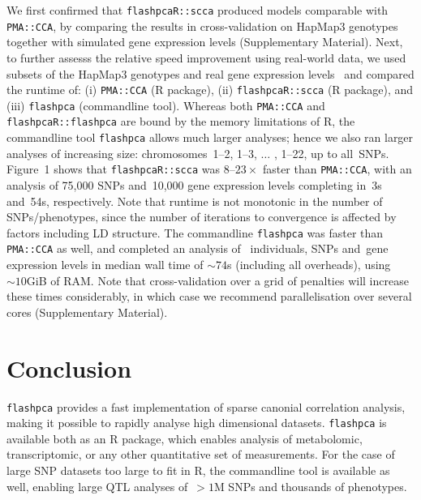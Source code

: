 \documentclass{bioinfo}
\begin{document}
We first confirmed that \texttt{flashpcaR::scca} produced models comparable
with \texttt{PMA::CCA}, by comparing the results in cross-validation on HapMap3
genotypes together with simulated gene expression levels (Supplementary
Material).  Next, to further assesss the relative speed improvement using
real-world data, we used subsets of the HapMap3 genotypes and real gene
expression levels~\citep{Stranger2012} and compared the runtime of: (i)
\texttt{PMA::CCA} (\textsf{R} package), (ii) \texttt{flashpcaR::scca}
(\textsf{R} package), and (iii) \texttt{flashpca} (commandline tool).
Whereas both \texttt{PMA::CCA} and \texttt{flashpcaR::flashpca} are bound by
the memory limitations of \textsf{R}, the commandline tool \texttt{flashpca}
allows much larger analyses; hence we also ran larger analyses of increasing
size: chromosomes~1--2, 1--3, $\hdots$ , 1--22, up to all~\nsnps SNPs.
Figure~1\vphantom{\ref{fig:01}} shows that \texttt{flashpcaR::scca} was
$8\text{--}23\times$ faster than \texttt{PMA::CCA}, with an analysis of
75,000 SNPs and~10,000 gene expression levels completing in~3s and~54s,
respectively.  Note that runtime is not monotonic in the number of
SNPs/phenotypes, since the number of iterations to convergence is affected
by factors including LD structure.  The commandline \texttt{flashpca} was
faster than \texttt{PMA::CCA} as well, and completed an analysis of~\nindiv
individuals, \nsnps SNPs and~\ngenes gene expression levels in median wall time
of ${\sim}74$s (including all overheads), using~${\sim}10$GiB of RAM. Note
that cross-validation over a grid of penalties will increase these times
considerably, in which case we recommend parallelisation over several cores
(Supplementary Material).\vspace*{-12pt}

\section{Conclusion}

\texttt{flashpca} provides a fast implementation of sparse canonial correlation
analysis, making it possible to rapidly analyse high dimensional datasets.
\texttt{flashpca} is available both as an \textsf{R} package, which enables
analysis of metabolomic, transcriptomic, or any other quantitative set
of measurements. For the case of large SNP datasets too large to fit in
\textsf{R}, the commandline tool is available as well, enabling large QTL
analyses of~${>}1$M SNPs and thousands of phenotypes.\vspace*{-12pt}
\end{document}
